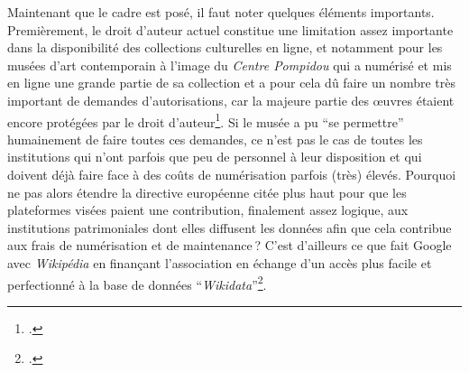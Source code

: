Maintenant que le cadre est posé, il faut noter quelques éléments importants. Premièrement, le droit d’auteur actuel constitue une limitation assez importante dans la disponibilité des collections culturelles en ligne, et notamment pour les musées d’art contemporain à l’image du \textit{Centre Pompidou} qui a numérisé et mis en ligne une grande partie de sa collection et a pour cela dû faire un nombre très important de demandes d’autorisations, car la majeure partie des œuvres étaient encore protégées par le droit d’auteur\footcite[§ 10]{bermes_parcours_2013}. Si le musée a pu \enquote{se permettre} humainement de faire toutes ces demandes, ce n’est pas le cas de toutes les institutions qui n’ont parfois que peu de personnel à leur disposition et qui doivent déjà faire face à des coûts de numérisation parfois (très) élevés. Pourquoi ne pas alors étendre la directive européenne citée plus haut pour que les plateformes visées paient une contribution, finalement assez logique, aux institutions patrimoniales dont elles diffusent les données afin que cela contribue aux frais de numérisation et de maintenance ? C’est d’ailleurs ce que fait Google avec \textit{Wikipédia} en finançant l’association en échange d’un accès plus facile et perfectionné à la base de données \enquote{\textit{Wikidata}}\footcite{noauthor_google_nodate}. 

